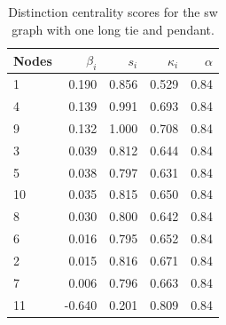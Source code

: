 \begin{table}
\centering
\caption{\label{tab:sw1p}Distinction centrality scores for the sw graph with one long tie and pendant.}
\centering
\begin{tabular}[t]{lrrrr}
\toprule
Nodes & $\beta_i$ & $s_i$ & $\kappa_i$ & $\alpha$\\
\midrule
1 & 0.190 & 0.856 & 0.529 & 0.84\\
4 & 0.139 & 0.991 & 0.693 & 0.84\\
9 & 0.132 & 1.000 & 0.708 & 0.84\\
3 & 0.039 & 0.812 & 0.644 & 0.84\\
5 & 0.038 & 0.797 & 0.631 & 0.84\\
10 & 0.035 & 0.815 & 0.650 & 0.84\\
8 & 0.030 & 0.800 & 0.642 & 0.84\\
6 & 0.016 & 0.795 & 0.652 & 0.84\\
2 & 0.015 & 0.816 & 0.671 & 0.84\\
7 & 0.006 & 0.796 & 0.663 & 0.84\\
11 & -0.640 & 0.201 & 0.809 & 0.84\\
\bottomrule
\end{tabular}
\end{table}
